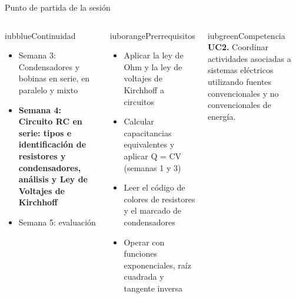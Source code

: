 \documentclass[aspectratio=169,11pt,xcolor={table}]{beamer}
\begin{document}
\begin{frame}{Punto de partida de la sesión}
\begin{columns}[T,onlytextwidth]
\begin{caja}[height=5.9cm]{iubblue}{Continuidad}
\scriptsize \begin{itemize}\setlength{\itemsep}{2pt}
  \item Semana 3: Condensadores y bobinas en serie, en paralelo y mixto
  \item \textbf{Semana 4: Circuito RC en serie: tipos e identificación de resistores y condensadores, análisis y Ley de Voltajes de Kirchhoff}
  \item Semana 5: evaluación
\end{itemize}
\end{caja}
\begin{caja}[height=5.9cm]{iuborange}{Prerrequisitos}
\scriptsize \begin{itemize}\setlength{\itemsep}{2pt}
  \item Aplicar la ley de Ohm y la ley de voltajes de Kirchhoff a circuitos
  \item Calcular capacitancias equivalentes y aplicar Q = CV (semanas 1 y 3)
  \item Leer el código de colores de resistores y el marcado de condensadores
  \item Operar con funciones exponenciales, raíz cuadrada y tangente inversa
\end{itemize}
\end{caja}
\begin{caja}[height=5.9cm]{iubgreen}{Competencia}
\scriptsize \textbf{UC2.} Coordinar actividades asociadas a sistemas eléctricos utilizando fuentes convencionales y no convencionales de energía.
\end{caja}
\end{columns}
\end{frame}
\end{document}
